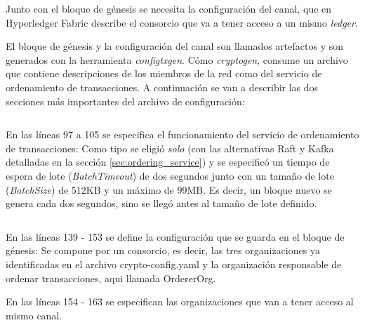 \begin{enumerate}
    Junto con el bloque de génesis se necesita la configuración del canal, que en Hyperledger Fabric describe el consorcio que va a tener acceso a un mismo \textit{ledger}.

    El bloque de génesis y la configuración del canal son llamados artefactos y son generados con la herramienta \textit{configtxgen}. Cómo \textit{cryptogen}, consume un archivo que contiene descripciones de los miembros de la red como del servicio de ordenamiento de transacciones. A continuación se van a describir las dos secciones más importantes del archivo de configuración:
    \inputminted[linenos, breaklines, bgcolor=mygray, firstline=97, lastline=105]{yaml}{Listings/configtx.yaml}
    En las líneas 97 a 105 se especifica el funcionamiento del servicio de ordenamiento de transacciones: Como tipo se eligió \textit{solo} (con las alternativas Raft y Kafka detalladas en la sección \ref{sec:ordering_service}) y se especificó un tiempo de espera de lote (\textit{BatchTimeout}) de dos segundos junto con un tamaño de lote (\textit{BatchSize}) de 512KB y un máximo de 99MB. Es decir, un bloque nuevo se genera cada dos segundos, sino se llegó antes al tamaño de lote definido.

    \inputminted[linenos, bgcolor=mygray, firstline=139, lastline=164]{yaml}{Listings/configtx.yaml}

    En las líneas 139 - 153 se define la configuración que se guarda en el bloque de génesis: Se compone por un consorcio, es decir, las tres organizaciones ya identificadas en el archivo crypto-config.yaml y la organización responsable de ordenar transacciones, aqui llamada OrdererOrg.
    
    En las líneas 154 - 163 se especifican las organizaciones que van a tener acceso al mismo canal.


\end{enumerate}
